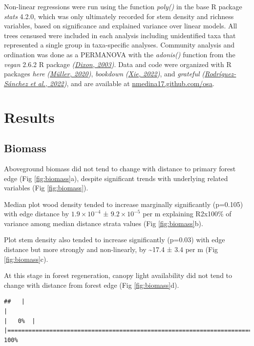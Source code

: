 \documentclass[
  12pt,
]{article}
\begin{document}
Non-linear regressions were run using the function \emph{poly()} in the base R package \emph{stats} 4.2.0,
which was only ultimately recorded for stem density and richness variables, based on significance and explained variance over linear models.
All trees censused were included in each analysis including unidentified taxa that represented a single group in taxa-specific analyses.
Community analysis and ordination was done as a PERMANOVA with the \emph{adonis()} function from the \emph{vegan} 2.6.2 R package \emph{(\protect\hyperlink{ref-dixon03}{Dixon, 2003})}.
Data and code were organized with R packages \emph{here} \emph{(\protect\hyperlink{ref-here}{Müller, 2020})}, \emph{bookdown} \emph{(\protect\hyperlink{ref-bookdown2022}{Xie, 2022})}, and \emph{grateful} \emph{(\protect\hyperlink{ref-grateful}{Rodríguez-Sánchez et al., 2022})}, and are available at \url{nmedina17.github.com/osa}.

\hypertarget{results}{%
\section{Results}\label{results}}

\hypertarget{biomass}{%
\subsection{Biomass}\label{biomass}}

Aboveground biomass did not tend to change with distance to primary forest edge
(Fig \ref{fig:biomass}a), despite significant trends with underlying related variables
(Fig \ref{fig:biomass}).

Median plot wood density tended to increase marginally significantly
(p=0.105)
with edge distance by
\ensuremath{1.9\times 10^{-4}} ±
\ensuremath{9.2\times 10^{-5}} per m
explaining
R2x100\% of variance
among median distance strata values
(Fig \ref{fig:biomass}b).

Plot stem density also tended to increase significantly
(p=0.03)
with edge distance but more strongly and non-linearly, by
\textasciitilde17.4 ±
3.4 per m
(Fig \ref{fig:biomass}c).

At this stage in forest regeneration, canopy light availability did not tend to change with distance from forest edge
(Fig \ref{fig:biomass}d).

\begin{verbatim}
##   |                                                                              |                                                                      |   0%  |                                                                              |======================================================================| 100%
\end{verbatim}
\end{document}
